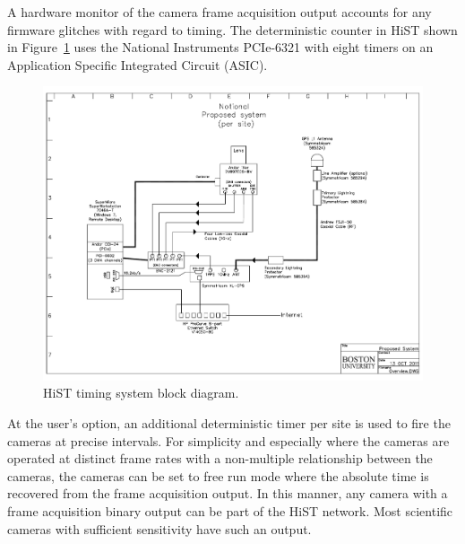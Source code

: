 A hardware monitor of the camera frame acquisition output accounts for any firmware glitches with regard to timing.
The deterministic counter in HiST shown in Figure~\ref{fig:histtime} uses the National Instruments PCIe-6321 with eight timers on an Application Specific Integrated Circuit (ASIC).
\begin{figure}\centering
    \includegraphics[page=1,width=0.95\linewidth]{gfx/ProposedTimingSystem}
    \caption{HiST timing system block diagram.}\label{fig:histtime}
\end{figure}
At the user's option, an additional deterministic timer per site is used to fire the cameras at precise intervals.
For simplicity and especially where the cameras are operated at distinct frame rates with a non-multiple relationship between the cameras, the cameras can be set to free run mode where the absolute time is recovered from the frame acquisition output.
In this manner, any camera with a frame acquisition binary output can be part of the HiST network.
Most scientific cameras with sufficient sensitivity have such an output.

